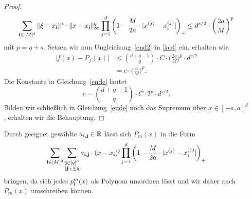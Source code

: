 \begin{proof}
\begin{equation}
 \label{end2}   
\sum_{\mathbf{i} \in [M]^d} \|\xi - x_{\mathbf{i}} \|^s \cdot \|x - x_{\mathbf{i}}\|_{\infty}^q \prod_{j = 1}^d \bigg(1 - \frac{M}{2a} \cdot |x^{(j)} - x_{\mathbf{i}}^{(j)}|\bigg)_+ \leq d^{s/2} \cdot \bigg(\frac{2a}{M}\bigg)^p
\end{equation} 
mit $p = q + s.$ Setzen wir nun Ungleichung~\eqref{end2} in \eqref{last} ein, erhalten wir:
\begin{equation}
\label{ende}
\begin{split}
|f(x) - P_f(x)| &\leq \binom{d + q - 1}{q} \cdot C \cdot \bigg(\frac{2a}{M}\bigg)^p \cdot d^{s/2}\\[0.5em]
& = c \cdot \bigg(\frac{a}{M}\bigg)^p.
\end{split}
\end{equation}
Die Konstante in Gleichung~\eqref{ende} lautet
$$c = \binom{d + q - 1}{q} \cdot C \cdot 2^p \cdot d^{s/2}.$$
Bilden wir schließlich in Gleichung~\eqref{ende} noch das Supremum über $x \in [-a, a]^d$, erhalten wir die Behauptung.
\end{proof}

Durch geeignet gewählte $a_{\mathbf{i}, \mathbf{j}} \in \mathbb{R}$ lässt sich $P_m(x)$ in die Form 
$$\sum_{\mathbf{i} \in [M]^d} \sum_{\substack{ \mathbf{j} \in [q]^d\\|\mathbf{j}|_1 \leq q}} a_{\mathbf{i}, \mathbf{j}} \cdot (x - x_{\mathbf{i}})^{\mathbf{j}} \prod_{j = 1}^d \bigg(1 - \frac{M}{2a} \cdot |x^{(j)} - x_{\mathbf{i}}^{(j)}|\bigg)_+$$
bringen, da sich jedes $p^m_{\mathbf{i}}(x)$ als Polynom umordnen lässt und wir daher auch $P_m(x)$ umschreiben können.

